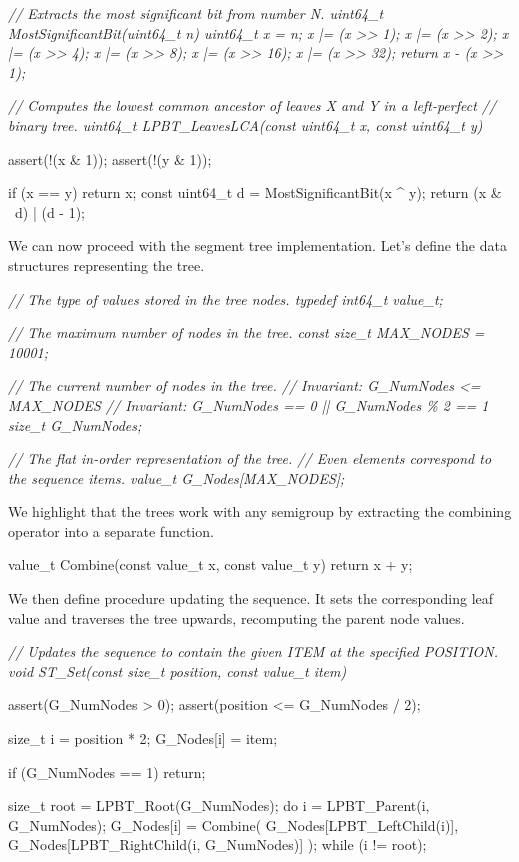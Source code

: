 \documentclass{article}
\begin{document}
\begin{code}[c]
\em{// Extracts the most significant bit from number N.}
uint64_t MostSignificantBit(uint64_t n) {
    uint64_t x = n;
    x |= (x >> 1);
    x |= (x >> 2);
    x |= (x >> 4);
    x |= (x >> 8);
    x |= (x >> 16);
    x |= (x >> 32);
    return x - (x >> 1);
}

\em{// Computes the lowest common ancestor of leaves X and Y in a left-perfect}
\em{// binary tree.}
uint64_t LPBT_LeavesLCA(const uint64_t x, const uint64_t y) {
    assert(!(x & 1));
    assert(!(y & 1));

    if (x == y) return x;
    const uint64_t d = MostSignificantBit(x ^ y);
    return (x & ~d) | (d - 1);
}
\end{code}

We can now proceed with the segment tree implementation.
Let's define the data structures representing the tree.

\begin{code}[c]
\em{// The type of values stored in the tree nodes.}
typedef int64_t value_t;

\em{// The maximum number of nodes in the tree.}
const size_t MAX_NODES = 10001;

\em{// The current number of nodes in the tree.}
\em{// Invariant: G_NumNodes <= MAX_NODES}
\em{// Invariant: G_NumNodes == 0 || G_NumNodes \% 2 == 1}
size_t G_NumNodes;

\em{// The flat in-order representation of the tree.}
\em{// Even elements correspond to the sequence items.}
value_t G_Nodes[MAX_NODES];
\end{code}

We highlight that the trees work with any semigroup by extracting the combining operator into a separate function.

\begin{code}[c]
value_t Combine(const value_t x, const value_t y) {
    return x + y;
}
\end{code}

We then define procedure  updating the sequence.
It sets the corresponding leaf value and traverses the tree upwards, recomputing the parent node values.

\begin{code}[c]
\em{// Updates the sequence to contain the given ITEM at the specified POSITION.}
void ST_Set(const size_t position, const value_t item) {
    assert(G_NumNodes > 0);
    assert(position <= G_NumNodes / 2);

    size_t i = position * 2;
    G_Nodes[i] = item;

    if (G_NumNodes == 1) return;

    size_t root = LPBT_Root(G_NumNodes);
    do {
        i = LPBT_Parent(i, G_NumNodes);
        G_Nodes[i] = Combine(
            G_Nodes[LPBT_LeftChild(i)],
            G_Nodes[LPBT_RightChild(i, G_NumNodes)]
        );
    } while (i != root);
}
\end{code}
\end{document}
